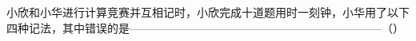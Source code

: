 
小欣和小华进行计算竞赛并互相记时，小欣完成十道题用时一刻钟，小华用了以下四种记法，其中错误的是--------------------------------------------------------------------（\hspace{4em}）
